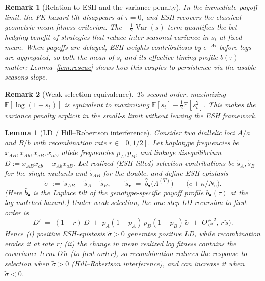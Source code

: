\documentclass[11pt]{article}
\theoremstyle{upright}
\newtheorem{lemma}{Lemma}
\newtheorem{remark}{Remark}
\newcommand{\Var}{\operatorname{Var}}
\newcommand{\Ne}{N_{\mathrm{e}}}
\newcommand{\hazT}[1]{\Lambda^{(#1)}}          %
\begin{document}
\begin{remark}[Relation to ESH and the variance penalty]
In the immediate-payoff limit, the FK hazard tilt disappears at $\tau=0$, and ESH recovers the classical \emph{geometric-mean fitness} criterion.
The $-\tfrac12\Var(s)$ term quantifies the bet-hedging benefit of strategies that reduce inter-seasonal variance in $s_t$ at fixed mean.
When payoffs are \emph{delayed}, ESH weights contributions by $e^{-\Lambda \tau}$ before logs are aggregated, so both the mean of $s_t$ and its effective timing profile $b(\tau)$ matter; Lemma~\ref{lem:rescue} shows how this couples to persistence via the usable-seasons slope.
\end{remark}

\begin{remark}[Weak-selection equivalence]
To second order, maximizing $\mathbb E[\log(1+s_t)]$ is equivalent to maximizing $\mathbb E[s_t]-\tfrac12\mathbb E[s_t^2]$.
This makes the variance penalty explicit in the small-$s$ limit without leaving the ESH framework.
\end{remark}

\begin{lemma}[LD / Hill--Robertson interference]\label{lem:ld}
Consider two diallelic loci $A/a$ and $B/b$ with recombination rate $r\in[0,1/2]$.
Let haplotype frequencies be $x_{AB},x_{Ab},x_{aB},x_{ab}$, allele frequencies $p_A,p_B$, and linkage disequilibrium $D:=x_{AB}x_{ab}-x_{Ab}x_{aB}$.
Let realized (ESH-tilted) selection contributions be
$\tilde s_A,\tilde s_B$ for the single mutants and $\tilde s_{AB}$ for the double, and define ESH-epistasis
\[
\tilde\sigma \;:=\; \tilde s_{AB} - \tilde s_A - \tilde s_B,
\qquad
\tilde s_\bullet \;=\; \widehat b_\bullet\!\big(\hazT{T}\big) \;-\; \big(c+\kappa/\Ne\big).
\]
(Here $\widehat b_\bullet$ is the Laplace tilt of the \emph{genotype-specific} payoff profile $b_\bullet(\tau)$ at the lag-matched hazard.)
Under \emph{weak selection}, the one-step LD recursion to first order is
\begin{equation}\label{eq:LD-QLE}
D' \;=\; (1-r)\,D \;+\; p_A(1-p_A)\,p_B(1-p_B)\,\tilde\sigma \;+\; O\!\big(\tilde s^2,\, r\,\tilde s\big).
\end{equation}
Hence (i) positive ESH-epistasis $\tilde\sigma>0$ generates \emph{positive} LD, while recombination erodes it at rate $r$; (ii) the change in mean realized log fitness contains the covariance term $D\,\tilde\sigma$ (to first order), so recombination reduces the response to selection when $\tilde\sigma>0$ (Hill--Robertson interference), and can increase it when $\tilde\sigma<0$.
\end{lemma}
\end{document}
